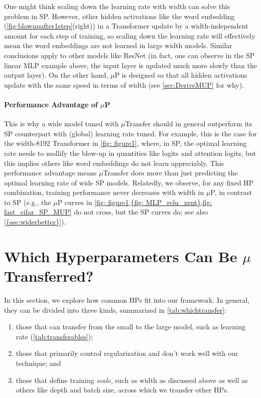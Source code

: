 \documentclass{article}
\theoremstyle{definition}
\begin{document}
  One might think scaling down the learning rate with width can solve this problem in SP.
  However, other hidden activations like the word embedding (\cref{fig:blowupafter1step}(right)) in a Transformer update by a width-independent amount for each step of training, so scaling down the learning rate will effectively mean the word embeddings are not learned in large width models.
  Similar conclusions apply to other models like ResNet (in fact, one can observe in the SP linear MLP example above, the input layer is updated much more slowly than the output layer).
  On the other hand, $\mu$P is designed so that all hidden activations update with the same speed in terms of width (see \cref{sec:DeriveMUP} for why). 
  
  \paragraph{Performance Advantage of $\mu$P}
  This is why a wide model tuned with $\mu$Transfer should in general outperform its SP counterpart with (global) learning rate tuned.
  For example, this is the case for the width-8192 Transformer in \cref{fig: figure1}, where, in SP, the optimal learning rate needs to mollify the blow-up in quantities like logits and attention logits, but this implies others like word embeddings do not learn appreciably.
  This performance advantage means $\mu$Transfer does more than just predicting the optimal learning rate of wide SP models.
  Relatedly, we observe, for any fixed HP combination, training performance never decreases with width in $\mu$P, in contrast to SP (e.g., the $\mu$P curves in \cref{fig: figure1,{fig: MLP_relu_xent},fig: fast_cifar_SP_MUP} do not cross, but the SP curves do; see also \cref{{sec:widerbetter}}).

  
  

\section{Which Hyperparameters Can Be \texorpdfstring{$\mu$}{mu}Transferred?}
\label{sec:whichtransfer?}

In this section, we explore how common HPs fit into our framework.
In general, they can be divided into three kinds, summarized in \cref{tab:whichtransfer}: 
\begin{enumerate}
    \item those that can transfer from the small to the large model, such as learning rate (\cref{tab:transferables});
    \item those that primarily control regularization and don't work well with our technique; and
    \item those that define training \emph{scale}, such as width as discussed above as well as others like depth and batch size, across which we transfer other HPs.
\end{enumerate}
\end{document}
